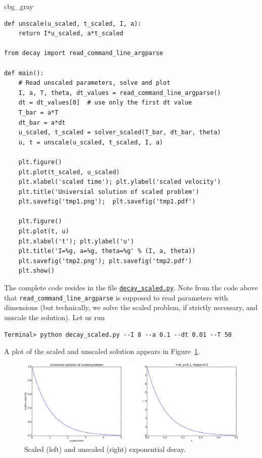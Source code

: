 \documentclass[graybox,envcountchap,sectrefs,final]{svmonodo}
\newenvironment{_cod_tight}[1]{
   \def\FrameCommand{\colorbox{#1}}
   \FrameRule0.6pt\MakeFramed {\FrameRestore}\vskip3mm}
   {\vskip0mm\endMakeFramed}
\newenvironment{cod}[1]{
\bgroup\rmfamily
\fboxsep=0mm\relax
\begin{_cod_tight}{#1}
\list{}{\parsep=-2mm\parskip=0mm\topsep=0pt\leftmargin=2mm
\rightmargin=2\leftmargin\leftmargin=4pt\relax}
\item\relax}
{\endlist\end{_cod_tight}\egroup}
\begin{document}
\begin{cod}{cbg_gray}\begin{Verbatim}[numbers=none,fontsize=\fontsize{9pt}{9pt},baselinestretch=0.95,xleftmargin=2mm]
def unscale(u_scaled, t_scaled, I, a):
    return I*u_scaled, a*t_scaled

from decay import read_command_line_argparse

def main():
    # Read unscaled parameters, solve and plot
    I, a, T, theta, dt_values = read_command_line_argparse()
    dt = dt_values[0]  # use only the first dt value
    T_bar = a*T
    dt_bar = a*dt
    u_scaled, t_scaled = solver_scaled(T_bar, dt_bar, theta)
    u, t = unscale(u_scaled, t_scaled, I, a)

    plt.figure()
    plt.plot(t_scaled, u_scaled)
    plt.xlabel('scaled time'); plt.ylabel('scaled velocity')
    plt.title('Universial solution of scaled problem')
    plt.savefig('tmp1.png');  plt.savefig('tmp1.pdf')

    plt.figure()
    plt.plot(t, u)
    plt.xlabel('t'); plt.ylabel('u')
    plt.title('I=%g, a=%g, theta=%g' % (I, a, theta))
    plt.savefig('tmp2.png'); plt.savefig('tmp2.pdf')
    plt.show()
\end{Verbatim}
\end{cod}
\noindent
The complete code resides in the file
\href{{http://tinyurl.com/o8pb3yy/decay_scaled.py}}{\nolinkurl{decay_scaled.py}}.
Note from the code above that \Verb!read_command_line_argparse! is supposed
to read parameters with dimensions (but technically, we solve the
scaled problem, if strictly necessary, and unscale the solution).
Let us run

\begin{Verbatim}[frame=lines,label=\fbox{{\tiny Terminal}},framesep=2.5mm,framerule=0.7pt,fontsize=\fontsize{9pt}{9pt}]
Terminal> python decay_scaled.py --I 8 --a 0.1 --dt 0.01 --T 50
\end{Verbatim}
A plot of the scaled and unscaled solution appears in Figure~\ref{sec:decay:fig:simplest}.


\begin{figure}[!ht]  %
  \centerline{\includegraphics[width=1.0\linewidth]{fig-scaling/decay.pdf}}
  \caption{
  Scaled (left) and unscaled (right) exponential decay. \label{sec:decay:fig:simplest}
  }
\end{figure}
\end{document}
